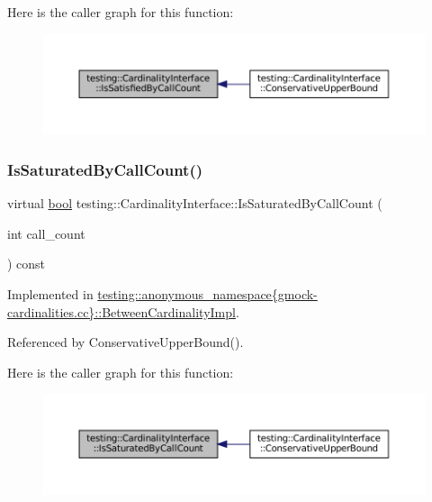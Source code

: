 Here is the caller graph for this function\+:
\nopagebreak
\begin{figure}[H]
\begin{center}
\leavevmode
\includegraphics[width=350pt]{classtesting_1_1CardinalityInterface_af89684f4ea6d9de331abf7958754d8f1_icgraph}
\end{center}
\end{figure}
\mbox{\label{classtesting_1_1CardinalityInterface_a42508cff9627de2e6f9c1ec33a7d8bf2}} 
\subsubsection{\texorpdfstring{Is\+Saturated\+By\+Call\+Count()}{IsSaturatedByCallCount()}}
{\footnotesize\ttfamily virtual \hyperlink{classbool}{bool} testing\+::\+Cardinality\+Interface\+::\+Is\+Saturated\+By\+Call\+Count (\begin{DoxyParamCaption}\item[{int}]{call\+\_\+count }\end{DoxyParamCaption}) const\hspace{0.3cm}{\ttfamily [pure virtual]}}



Implemented in \hyperlink{classtesting_1_1anonymous__namespace_02gmock-cardinalities_8cc_03_1_1BetweenCardinalityImpl_add59b47271e1dc87cf2cde64ecf9ff9e}{testing\+::anonymous\+\_\+namespace\{gmock-\/cardinalities.\+cc\}\+::\+Between\+Cardinality\+Impl}.



Referenced by Conservative\+Upper\+Bound().

Here is the caller graph for this function\+:
\nopagebreak
\begin{figure}[H]
\begin{center}
\leavevmode
\includegraphics[width=350pt]{classtesting_1_1CardinalityInterface_a42508cff9627de2e6f9c1ec33a7d8bf2_icgraph}
\end{center}
\end{figure}


